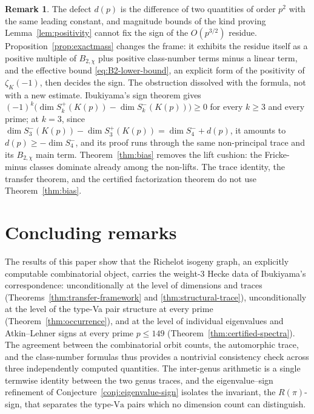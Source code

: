 \documentclass[11pt]{amsart}
\theoremstyle{plain}
\theoremstyle{definition}
\newtheorem{remark}[theorem]{Remark}
\newcommand{\Va}{\mathrm{Va}}
\providecommand{\Va}{\mathrm{Va}}
\begin{document}
	\begin{remark}\label{rem:sign-accessible}
		The defect $d(p)$ is the difference of two quantities of order $p^2$
		with the same leading constant, and magnitude bounds of the kind
		proving Lemma~\ref{lem:positivity} cannot fix the sign of the
		$O(p^{3/2})$ residue. Proposition~\ref{prop:exactmass} changes the
		frame: it exhibits the residue itself as a positive multiple of
		$B_{2,\chi}$ plus positive class-number terms minus a linear term,
		and the effective bound \eqref{eq:B2-lower-bound}, an explicit form
		of the positivity of $\zeta_K(-1)$, then decides the sign. The
		obstruction dissolved with the formula, not with a new estimate.
		Ibukiyama's sign theorem \cite[Thm.~7.1]{Ibukiyama-dim} gives
		$(-1)^k\bigl(\dim S_k^{+}(K(p))-\dim S_k^{-}(K(p))\bigr)\ge0$ for every
		$k\ge3$ and every prime; at $k=3$, since
		$\dim S_3^{-}(K(p))-\dim S_3^{+}(K(p))=\dim S_4^{-}+d(p)$, it amounts to
		$d(p)\ge-\dim S_4^{-}$, and its proof runs through the same
		non-principal trace and its $B_{2,\chi}$ main term.
		Theorem~\ref{thm:bias} removes the lift cushion: the Fricke-minus
		classes dominate already among the non-lifts. The
		trace identity, the transfer theorem, and the certified factorization
		theorem do not use Theorem~\ref{thm:bias}.
	\end{remark}
	
	\section{Concluding remarks}
	\label{sec:concl}
	
	The results of this paper show that the Richelot isogeny graph, an explicitly computable combinatorial object, carries the weight-$3$ Hecke data of Ibukiyama's correspondence: unconditionally at the level of dimensions and traces (Theorems~\ref{thm:transfer-framework} and \ref{thm:structural-trace}), unconditionally at the level of the type-Va pair structure at every prime (Theorem~\ref{thm:occurrence}), and at the level of individual eigenvalues and Atkin--Lehner signs at every prime $p\le149$ (Theorem~\ref{thm:certified-spectra}). The agreement between the combinatorial orbit counts, the automorphic trace, and the class-number formulas thus provides a nontrivial consistency check across three independently computed quantities. The inter-genus arithmetic is a single termwise identity between the two genus traces, and the eigenvalue--sign refinement of Conjecture~\ref{conj:eigenvalue-sign} isolates the invariant, the $R(\pi)$-sign, that separates the type-$\Va$ pairs which no dimension count can distinguish.
	
\end{document}
